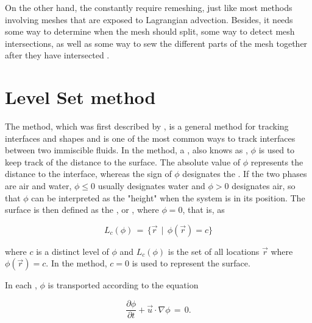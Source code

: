 On the other hand, the constantly require remeshing, just like most methods involving meshes that are exposed to Lagrangian advection. Besides, it needs some way to determine when the mesh should split, some way to detect mesh intersections, as well as some way to sew the different parts of the mesh together after they have intersected \citep{Wojtan2009}.

\section{Level Set method}

The \LS method, which was first described by \citet{Osher1988}, is a general method for tracking interfaces and shapes and is one of the most common ways to track interfaces between two immiscible fluids. In the \LS method, a , also knows as , $\phi$ is used to keep track of the distance to the surface. The absolute value of $\phi$ represents the distance to the interface, whereas the sign of $\phi$ designates the \phase. If the two phases are air and water, $\phi \leq 0$ usually designates water and $\phi > 0$ designates air, so that $\phi$ can be interpreted as the "height" when the system is in its \equilibrium position. The surface is then defined as the \isosurface, or , where $\phi = 0$, that is, as

\begin{equation} \label{eq:level_set}
L_c(\phi) \,=\, \{\vec{r} \,\mid\, \phi(\vec{r})=c\}
\end{equation}

where $c$ is a distinct level of $\phi$ and $L_c(\phi)$ is the set of all locations $\vec{r}$ where $\phi(\vec{r}) = c$. In the \LS method, $c = 0$ is used to represent the surface.

In each , $\phi$ is transported according to the equation

\begin{equation} \label{eq:level_set_function_transport}
\frac{\partial\phi}{\partial t} + \vec{u}\cdot\nabla\phi \,=\, 0.
\end{equation}

